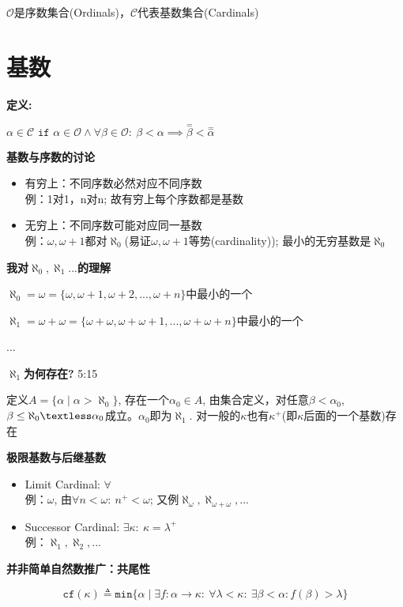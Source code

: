 \documentclass[UTF8, 9pt, a4paper]{ctexart}
\newcommand{\ksec}[2]{\noindent \textbf{\large #1} #2\par}
\begin{document}
	
	$ \mathcal{O} $是序数集合(Ordinals)，$ \mathcal{C} $代表基数集合(Cardinals)
	
	\section{基数}
	
	\ksec{定义:}{}
		$  \alpha \in \mathcal{C} \texttt{ if } \alpha \in \mathcal{O} \land \forall \beta \in \mathcal{O}:\ \beta < \alpha \implies \overset{=}{\beta} < \overset{=}{\alpha} $
	
	\ksec{基数与序数的讨论}{}
	\begin{itemize}
		\item 有穷上：不同序数必然对应不同序数\\
			例：1对1，n对n; 故有穷上每个序数都是基数
		\item 无穷上：不同序数可能对应同一基数\\
			例：$ \omega, \omega+1 $都对$ \aleph_0 $(易证$ \omega,\omega+1 $等势(cardinality)); 最小的无穷基数是$ \aleph_0 $
	\end{itemize}
	
	\ksec{我对$ \aleph_0, \aleph_1... $的理解}{}
	$ \aleph_0 = \omega = \{\omega, \omega + 1, \omega + 2, ... ,\omega + n\} $中最小的一个
	
	$ \aleph_1 = \omega + \omega = \{ \omega + \omega, \omega + \omega + 1, ..., \omega + \omega + n \}$中最小的一个
	
	...
	
	\ksec{$\aleph_1$为何存在?}{5:15}
	定义$ A=\{ \alpha \mid \alpha >\aleph_0 \} $, 存在一个$ \alpha_0 \in A $, 由集合定义，对任意$ \beta < \alpha_0$, $ \beta \leq \aleph_0 \textless \alpha_0 $成立。$ \alpha_0 $即为$ \aleph_1 $. 对一般的$ \kappa $也有$ \kappa^{+} $(即$ \kappa $后面的一个基数)存在
	
	\ksec{极限基数与后继基数}{}
	\begin{itemize}
		\item Limit Cardinal: $ \forall  $\\
		例：$ \omega $, 由$ \forall n < \omega: \ n^{+} < \omega $; 又例$ \aleph_\omega, \aleph_{\omega + \omega},... $
		\item Successor Cardinal: $ \exists \kappa:\ \kappa = \lambda^{+} $\\
		例：$ \aleph_1, \aleph_2, ... $
	\end{itemize}


	\ksec{并非简单自然数推广：共尾性}{}
	$$ \texttt{cf}(\kappa) \triangleq \texttt{min}\{ \alpha \mid \exists f: \alpha \rightarrow \kappa :\ \forall \lambda < \kappa:\ \exists \beta < \alpha: f(\beta) > \lambda \} $$
	
\end{document}
